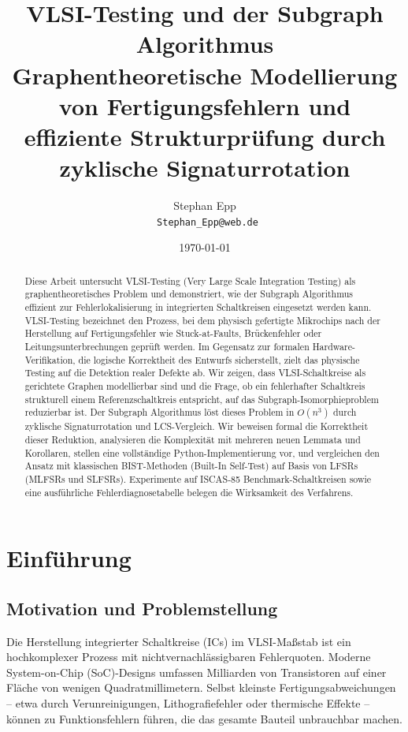 ﻿\documentclass[a4paper,12pt]{article}
\title{\textbf{VLSI-Testing und der Subgraph Algorithmus}\\[4pt]
\large Graphentheoretische Modellierung von Fertigungs\-fehlern und
effiziente Struktur\-prüfung durch zyklische Signaturrotation}
\author{Stephan Epp\\[2pt]
\
\small \texttt{Stephan\_Epp@web.de}}
\date{\today}
\theoremstyle{definition}
\begin{document}
\maketitle

\begin{abstract}
Diese Arbeit untersucht VLSI-Testing (Very Large Scale Integration Testing)
als graphentheoretisches Problem und demonstriert, wie der Subgraph
Algorithmus~\cite{epp2026subgraph} effizient zur Fehlerlokalisierung in
integrierten Schaltkreisen eingesetzt werden kann.
VLSI-Testing bezeichnet den Prozess, bei dem physisch gefertigte Mikrochips
nach der Herstellung auf Fertigungsfehler wie Stuck-at-Faults,
Brücken\-fehler oder Leitungs\-unter\-brechungen geprüft werden.
Im Gegensatz zur formalen Hardware-Verifikation, die logische Korrektheit
des Entwurfs sicherstellt, zielt das physische Testing auf die Detektion
realer Defekte ab.
Wir zeigen, dass VLSI-Schaltkreise als gerichtete Graphen modellierbar sind
und die Frage, ob ein fehlerhafter Schaltkreis strukturell einem
Referenzschaltkreis entspricht, auf das Subgraph-Isomorphieproblem
reduzierbar ist.
Der Subgraph Algorithmus löst dieses Problem in $O(n^3)$ durch zyklische
Signaturrotation und LCS-Vergleich.
Wir beweisen formal die Korrektheit dieser Reduktion, analysieren die
Komplexität mit mehreren neuen Lemmata und Korollaren, stellen eine
vollständige Python-Implementierung vor, und vergleichen den Ansatz mit
klassischen BIST-Methoden (Built-In Self-Test) auf Basis von LFSRs
(MLFSRs und SLFSRs).
Experimente auf ISCAS-85 Benchmark-Schaltkreisen sowie eine ausführliche
Fehlerdiagnosetabelle belegen die Wirksamkeit des Verfahrens.
\end{abstract}

\tableofcontents
\newpage

\section{Einführung}

\subsection{Motivation und Problemstellung}

Die Herstellung integrierter Schaltkreise (ICs) im VLSI-Maßstab ist ein
hochkomplexer Prozess mit nichtvern\-achlässigbaren Fehlerquoten. Moderne
System-on-Chip (SoC)-Designs umfassen Milliarden von Transistoren auf einer
Fläche von wenigen Quadrat\-millimetern. Selbst kleinste
Fertigungs\-abweichungen -- etwa durch Verunreinigungen, Litho\-grafie\-fehler
oder thermische Effekte -- können zu Funktions\-fehlern führen, die das
gesamte Bauteil unbrauchbar machen.
\end{document}
